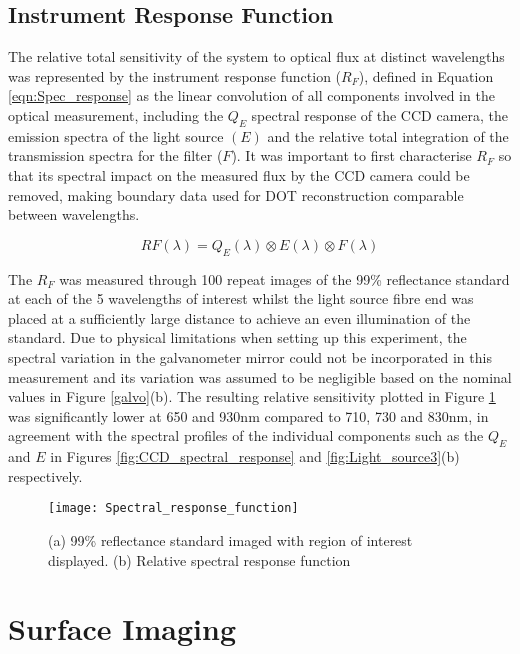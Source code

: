 \documentclass[twoside]{bhamthesis}
\theoremstyle{definition}
\begin{document}
\subsection{Instrument Response Function}
\label{appendix:IRF}

The relative total sensitivity of the system to optical flux at distinct wavelengths was represented by the instrument response function ($R_F$), defined in Equation \ref{eqn:Spec_response} as the linear convolution of all components involved in the optical measurement, including the $Q_E$ spectral response of the CCD camera, the emission spectra of the light source $(E)$ and the relative total integration of the transmission spectra for the filter ($F$). It was important to first characterise $R_F$ so that its spectral impact on the measured flux by the CCD camera could be removed, making boundary data used for DOT reconstruction comparable between wavelengths.

\begin{equation}
RF(\lambda) = Q_E(\lambda) \otimes E(\lambda) \otimes F(\lambda)
  \label{eqn:Spec_response}
\end{equation}

The $R_F$ was measured through 100 repeat images of the 99\% reflectance standard at each of the 5 wavelengths of interest whilst the light source fibre end was placed at a sufficiently large distance to achieve an even illumination of the standard. Due to physical limitations when setting up this experiment, the spectral variation in the galvanometer mirror could not be incorporated in this measurement and its variation was assumed to be negligible based on the nominal values in Figure \ref{galvo}(b). The resulting relative sensitivity plotted in Figure \ref{eqn:Spectral_response_function} was significantly lower at 650 and 930nm compared to 710, 730 and 830nm, in agreement with the spectral profiles of the individual components such as the $Q_E$ and $E$ in Figures \ref{fig:CCD_spectral_response} and \ref{fig:Light_source3}(b) respectively. 

\begin{figure}[!ht]
\centering
  \texttt{[image: Spectral\_response\_function]}
\caption{ (a) 99\% reflectance standard imaged with region of interest displayed. (b) Relative spectral response function}
  \label{eqn:Spectral_response_function}
\end{figure}

\section{Surface Imaging}
\label{Surface_imaging}
\end{document}

